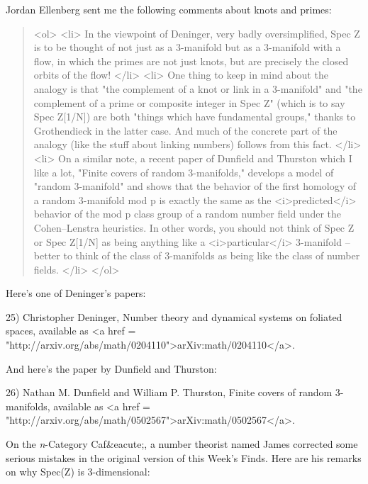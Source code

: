 Jordan Ellenberg sent me the following comments about knots and primes:

\begin{quote}

<ol>
<li>
In the viewpoint of Deninger, very badly
oversimplified, Spec Z is to be thought of not just as a
3-manifold but as a 3-manifold with
a flow, in which the primes are not just knots, but are precisely the
closed orbits of the flow!
</li>
<li>
One thing to keep in mind about the analogy is that "the complement of
a knot or link in a 3-manifold" and "the complement of a prime or composite
integer in Spec Z" (which is to say Spec Z[1/N])
are both "things which have fundamental groups," thanks to Grothendieck in
the latter case.  And much of the concrete part of the analogy (like the
stuff about linking numbers) follows from this
fact.
</li>
<li>
On a similar note, a recent paper of Dunfield and Thurston which
I like a lot, "Finite covers
of random 3-manifolds," develops a model of "random 3-manifold" and
shows that the behavior of the first
homology of a random 3-manifold mod p is exactly the same as the
<i>predicted</i> behavior of the mod p class group of a random number
field under the Cohen--Lenstra heuristics.  In other words, you should
not think of Spec Z or Spec Z[1/N] as being anything
like a <i>particular</i> 3-manifold -- better to think of the class of
3-manifolds as being like the class of number fields.
</li>
</ol>

\end{quote}

Here's one of Deninger's papers:

25) Christopher Deninger, Number theory and dynamical systems on
foliated spaces, available as <a href = "http://arxiv.org/abs/math/0204110">arXiv:math/0204110</a>.

And here's the paper by Dunfield and Thurston:

26) Nathan M. Dunfield and William P. Thurston, Finite covers of
random 3-manifolds, available as <a href = "http://arxiv.org/abs/math/0502567">arXiv:math/0502567</a>.

On the \emph{n}-Category Caf&eacute;, a number theorist named James
corrected some serious mistakes in the original version of this Week's
Finds.  Here are his remarks on why Spec(Z) is 3-dimensional:

